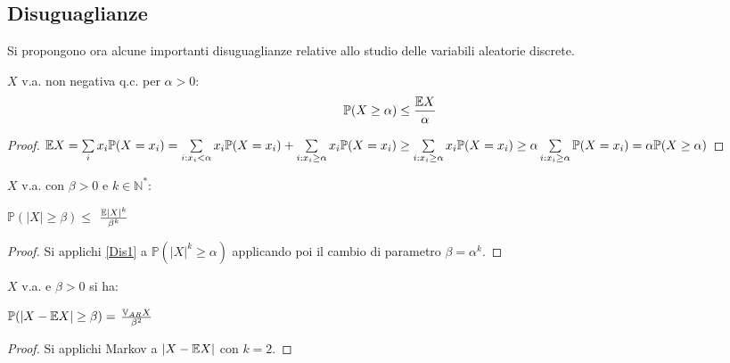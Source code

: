 \subsection{Disuguaglianze}

Si propongono ora alcune importanti disuguaglianze relative allo studio delle variabili aleatorie discrete.

\vspace{15px}


\begin{proposition}
$X$ v.a. non negativa q.c. per $\alpha>0$:
\begin{equation}
    \mathbb{P}(X\geq\alpha)\leq
    {\large \frac{\mathbb{E}X}{\alpha}}
\end{equation}
\label{Dis1}

\vspace{5px}
\begin{proof}
$\mathbb{E} X=\sum\limits_ix_i\mathbb{P}(X=x_i)=\sum\limits_{i:x_i<\alpha}x_i\mathbb{P}(X=x_i)+\sum\limits_{i:x_i\geq\alpha}x_i\mathbb{P}(X=x_i)\geq\sum\limits_{i:x_i\geq\alpha}x_i\mathbb{P}(X=x_i)\geq\alpha\sum\limits_{i:x_i\geq\alpha}\mathbb{P}(X=x_i)=\alpha\mathbb{P}(X\geq\alpha)$
\end{proof}
\end{proposition}

\vspace{10px}

\begin{proposition} \label{Dis_Markov}
$X$ v.a. con $\beta>0$ e $k\in\mathbb{N}^*$:
\begin{center}
    $\mathbb{P}(|X|\geq\beta)\leq$
    {\large $\frac{\mathbb{E}|X|^k}{\beta^k}$}
\end{center}
\vspace{5px}
\begin{proof}
Si applichi \ref{Dis1} a $\mathbb{P}(|X|^k\geq\alpha)$ applicando poi il cambio di parametro $\beta=\alpha^k$.
\end{proof}
\end{proposition}

\vspace{10px}

\begin{proposition}
$X$ v.a. e $\beta>0$ si ha:
\begin{center}
    $\mathbb{P}(|X-\mathbb{E} X|\geq\beta)=$
    {\large $\frac{\mathbb{V}_{AR} X}{\beta^2}$}
\end{center}
\vspace{5px}
\begin{proof}
Si applichi Markov a $|X-\mathbb{E} X|$ con $k=2$.
\end{proof}
\end{proposition}


